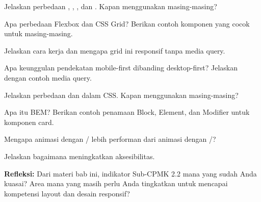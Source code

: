 \documentclass[../main.tex]{subfiles}
\begin{document}
\begin{latihan}
  \item Jelaskan perbedaan , , , dan . Kapan menggunakan masing-masing?
  \item Apa perbedaan Flexbox dan CSS Grid? Berikan contoh komponen yang cocok untuk masing-masing.
  \item Jelaskan cara kerja  dan mengapa grid ini responsif tanpa media query.
  \item Apa keunggulan pendekatan mobile-first dibanding desktop-first? Jelaskan dengan contoh media query.
  \item Jelaskan perbedaan  dan  dalam CSS. Kapan menggunakan masing-masing?
  \item Apa itu BEM? Berikan contoh penamaan Block, Element, dan Modifier untuk komponen card.
  \item Mengapa animasi dengan / lebih performan dari animasi dengan /?
  \item Jelaskan bagaimana  meningkatkan aksesibilitas.
  \item \textbf{Refleksi:} Dari materi bab ini, indikator Sub-CPMK 2.2 mana yang sudah Anda kuasai? Area mana yang masih perlu Anda tingkatkan untuk mencapai kompetensi layout dan desain responsif?
\end{latihan}
\end{document}
